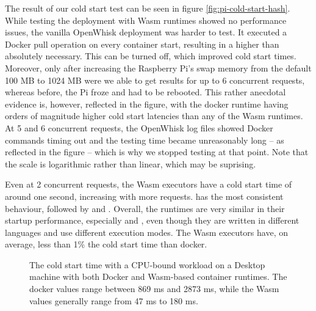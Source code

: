 The result of our cold start test can be seen in figure \ref{fig:pi-cold-start-hash}. While testing the deployment with Wasm runtimes showed no performance issues, the vanilla OpenWhisk deployment was harder to test. It executed a Docker pull operation on every container start, resulting in a higher  than absolutely necessary. This can be turned off, which improved cold start times. Moreover, only after increasing the Raspberry Pi's swap memory from the default 100 MB to 1024 MB were we able to get results for up to 6 concurrent requests, whereas before, the Pi froze and had to be rebooted. This rather anecdotal evidence is, however, reflected in the figure, with the docker runtime having orders of magnitude higher cold start latencies than any of the Wasm runtimes. At 5 and 6 concurrent requests, the OpenWhisk log files showed Docker commands timing out and the testing time became unreasonably long -- as reflected in the figure -- which is why we stopped testing at that point. Note that the scale is logarithmic rather than linear, which may be suprising.

Even at 2 concurrent requests, the Wasm executors have a cold start time of around one second, increasing with more requests.  has the most consistent behaviour, followed by  and . Overall, the runtimes are very similar in their startup performance, especially  and , even though they are written in different languages and use different execution modes. The Wasm executors have, on average, less than 1\% the cold start time than docker.


\begin{figure}
    \begin{center}
        
    \end{center}
    \caption{The cold start time with a CPU-bound workload on a Desktop machine with both Docker and Wasm-based container runtimes. The docker values range between 869 ms and 2873 ms, while the Wasm values generally range from 47 ms to 180 ms.}
    \label{fig:pc-cold-start-hash}
\end{figure}

